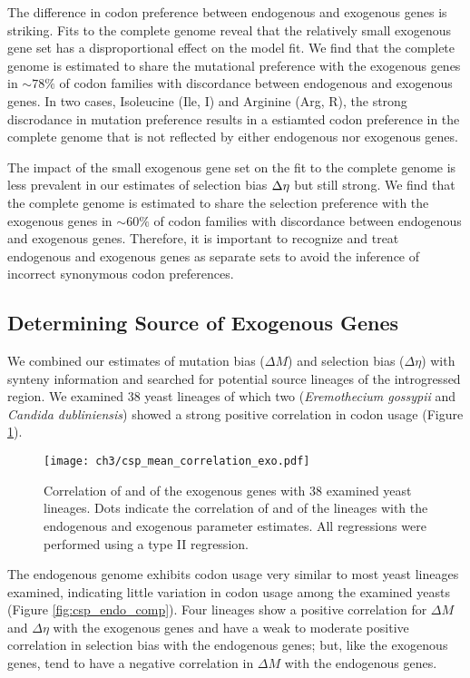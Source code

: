The difference in codon preference between endogenous and exogenous genes is striking.
Fits to the complete \kluyveri genome reveal that the relatively small exogenous gene set has a disproportional effect on the model fit.
We find that the complete \kluyveri genome is estimated to share the mutational preference with the exogenous genes in $\sim78\%$ of codon families with discordance between endogenous and exogenous genes.
In two cases, Isoleucine (Ile, I) and Arginine (Arg, R), the strong discrodance in mutation preference results in a estiamted codon preference in the complete \kluyveri genome that is not reflected by either endogenous nor exogenous genes.

The impact of the small exogenous gene set on the fit to the complete \kluyveri genome is less prevalent in our estimates of selection bias ${\Delta \eta}$ but still strong.
We find that the complete \kluyveri genome is estimated to share the selection preference with the exogenous genes in $\sim60\%$ of codon families with discordance between endogenous and exogenous genes.
Therefore, it is important to recognize and treat endogenous and exogenous genes as separate sets to avoid the inference of incorrect synonymous codon preferences.

\subsection{Determining Source of Exogenous Genes}

We combined our estimates of mutation bias ($\Delta M$) and selection bias ($\Delta \eta$) with synteny information and searched for potential source lineages of the introgressed region.
We examined 38 yeast lineages of which two (\emph{Eremothecium gossypii} and \emph{Candida dubliniensis}) showed a strong positive correlation in codon usage (Figure \ref{fig:csp_exo_comp}).

\begin{figure}[H]
     \centering
	\texttt{[image: ch3/csp\_mean\_correlation\_exo.pdf]}
	\caption{Correlation of \DM and \DE of the exogenous genes with 38 examined yeast lineages. Dots indicate the correlation of \DM and \DE of the lineages with the endogenous and exogenous parameter estimates. All regressions were performed using a type II regression.}
	\label{fig:csp_exo_comp}
\end{figure}

The endogenous \kluyveri genome exhibits codon usage very similar to most yeast lineages examined, indicating little variation in codon usage among the examined yeasts (Figure \ref{fig:csp_endo_comp}).
Four lineages show a positive correlation for $\Delta M$ and $\Delta \eta$ with the exogenous genes and have a weak to moderate positive correlation in selection bias with the endogenous genes; but, like the exogenous genes, tend to have a negative correlation in $\Delta M$ with the endogenous genes.

